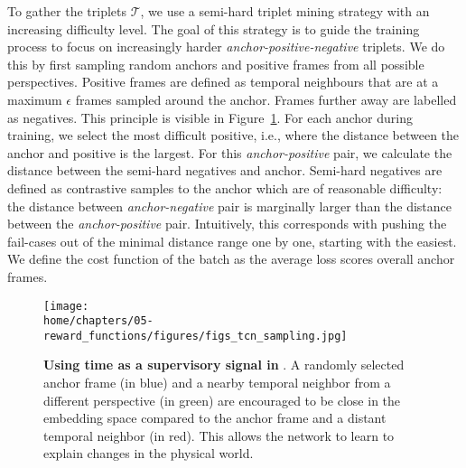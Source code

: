 \documentclass[\home/main.tex]{subfiles}
\begin{document}
%

To gather the triplets $\mathcal{T}$, we use a semi-hard triplet mining strategy with an increasing difficulty level. The goal of this strategy is to guide the training process to focus on increasingly harder \textit{anchor-positive-negative} triplets. We do this by first sampling random anchors and positive frames from all possible perspectives. Positive frames are defined as temporal neighbours that are at a maximum $\epsilon$ frames sampled around the anchor. Frames further away are labelled as negatives. This principle is visible in Figure~\ref{fig:triplet_mining}. For each anchor during training, we select the most difficult positive, i.e., where the distance between the anchor and positive is the largest. For this \textit{anchor-positive} pair, we calculate the distance between the semi-hard negatives and anchor. Semi-hard negatives are defined as contrastive samples to the anchor which are of reasonable difficulty: the distance between \textit{anchor-negative} pair is marginally larger than the distance between the \textit{anchor-positive} pair. Intuitively, this corresponds with pushing the fail-cases out of the minimal distance range one by one, starting with the easiest. We define the cost function of the batch as the average loss scores overall anchor frames.

\begin{figure}[htbp]
    \centering
    \texttt{[image: \\home/chapters/05-reward\_functions/figures/figs\_tcn\_sampling.jpg]}
    \caption{\textbf{Using time as a supervisory signal in }. A randomly selected anchor frame (in blue) and a nearby temporal neighbor from a different perspective (in green) are encouraged to be close in the embedding space compared to the anchor frame and a distant temporal neighbor (in red). This allows the network to learn to explain changes in the physical world.}
    \label{fig:triplet_mining}
\end{figure}
\end{document}
